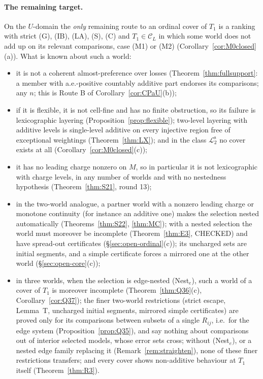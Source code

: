 \documentclass[11pt]{article}
\theoremstyle{definition}
\theoremstyle{remark}
\newcommand{\C}{\mathcal C}
\newcommand{\Ltwo}{\mathcal L_2^{\mathrm s}}
\begin{document}
\paragraph{The remaining target.} On the $U$-domain the \emph{only} remaining route to an ordinal cover of $T_1$ is a ranking with strict (G), (IB), (LA), (S), (C) and $T_1\in\C_L$ in which some world does not add up on its relevant comparisons, case (M1) or (M2) (Corollary~\ref{cor:M0closed}(a)). What is known about such a world:
\begin{itemize}[leftmargin=*]
\item it is not a coherent almost-preference over losses (Theorem~\ref{thm:fullsupport}: a member with a.e.-positive countably additive part endorses its comparisons; any $n$; this is Route B of Corollary~\ref{cor:CPaU}(b));
\item if it is flexible, it is not cell-fine and has no finite obstruction, so its failure is lexicographic layering (Proposition~\ref{prop:flexible}); two-level layering with additive levels is single-level additive on every injective region free of exceptional weightings (Theorem~\ref{thm:LX}); and in the class $\Ltwo$ no cover exists at all (Corollary~\ref{cor:M0closed}(c));
\item it has no leading charge nonzero on $M$, so in particular it is not lexicographic with charge levels, in any number of worlds and with no nestedness hypothesis (Theorem~\ref{thm:S21}, round 13);
\item in the two-world analogue, a partner world with a nonzero leading charge or monotone continuity (for instance an additive one) makes the selection nested automatically (Theorems~\ref{thm:S22}, \ref{thm:MC}); with a nested selection the world must moreover be incomplete (Theorem~\ref{thm:E3}, CHECKED) and have spread-out certificates (\S\ref{sec:open-ordinal}(c)); its uncharged sets are initial segments, and a simple certificate forces a mirrored one at the other world (\S\ref{sec:open-core}(c));
\item in three worlds, when the selection is edge-nested (Nest$_e$), such a world of a cover of $T_1$ is moreover incomplete (Theorem~\ref{thm:Q36}(c), Corollary~\ref{cor:Q37}); the finer two-world restrictions (strict escape, Lemma~T, uncharged initial segments, mirrored simple certificates) are proved only for its comparisons between subsets of a single $R_{ij}$, i.e.\ for the edge system (Proposition~\ref{prop:Q35}), and say nothing about comparisons out of interior selected models, whose error sets cross; without (Nest$_e$), or a nested edge family replacing it (Remark~\ref{rem:straighten}), none of these finer restrictions transfers; and every cover shows non-additive behaviour at $T_1$ itself (Theorem~\ref{thm:R3}).
\end{itemize}
\end{document}
